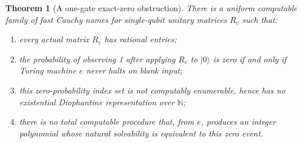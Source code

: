 \documentclass[11pt,letterpaper]{article}
\numberwithin{equation}{section}
\newtheorem{theorem}{Theorem}[section]
\theoremstyle{definition}
\theoremstyle{remark}
\newcommand{\N}{\mathbb N}
\newcommand{\ket}[1]{\lvert #1\rangle}
\begin{document}
\begin{theorem}[A one-gate exact-zero obstruction]
\label{pqc:cc:thm:cauchy}
There is a uniform computable family of fast Cauchy names for single-qubit
unitary matrices $R_e$ such that:
\begin{enumerate}[label=(\roman*)]
\item every actual matrix $R_e$ has rational entries;
\item the probability of observing 1 after applying $R_e$ to $\ket0$ is zero
if and only if Turing machine $e$ never halts on blank input;
\item this zero-probability index set is not computably enumerable, hence
has no existential Diophantine representation over $\N$;
\item there is no total computable procedure that, from $e$, produces an
integer polynomial whose natural solvability is equivalent to this zero event.
\end{enumerate}
\end{theorem}
\end{document}
